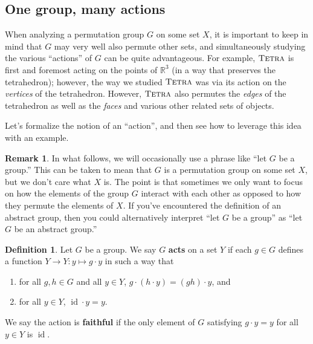 \documentclass[11pt]{amsart}
\theoremstyle{plain}
\theoremstyle{definition}
\newtheorem*{definition*}{Definition}
\newtheorem*{remark*}{Remark}
\theoremstyle{remark}
\newcommand{\symtetra}{\textsc{Tetra}}
\DeclareMathOperator{\id}{id}
\begin{document}
\subsection{One group, many actions}

When analyzing a permutation group $G$ on some set $X$, it is  important to keep in mind that $G$ may very well also permute other sets, and simultaneously studying the various ``actions'' of $G$ can be quite advantageous. For example, $\symtetra$ is first and foremost acting on the points of $\mathbb{R}^3$ (in a way that preserves the tetrahedron); however, the way we studied $\symtetra$ was via its action on the \emph{vertices} of the tetrahedron. However, $\symtetra$ also permutes the \emph{edges} of the tetrahedron as well as the \emph{faces} and various other related sets of objects. 

Let's formalize the notion of an ``action'', and then see how to leverage this idea with an example.

\begin{remark*}
In what follows, we will occasionally use a phrase like ``let $G$ be a group.'' This can be taken to mean that $G$ is a permutation group on some set $X$, but we don't care what $X$ is. The point is that sometimes we only want to focus on how the elements of the group $G$ interact with each other as opposed to how they permute the elements of $X$. If you've encountered the definition of an abstract group, then you could alternatively interpret ``let $G$ be a group'' as ``let $G$ be an abstract group.''
\end{remark*}

\begin{definition*}
Let $G$ be a group. We say $G$ \textbf{acts} on a set $Y$ if each $g\in G$ defines a function $Y \rightarrow Y : y \mapsto g\cdot y$ in such a way that 
\begin{enumerate}
\item for all $g,h\in G$ and all $y\in Y$, $g\cdot (h\cdot y) = (gh)\cdot y$, and
\item for all $y\in Y$, $\id\cdot y = y$.
\end{enumerate}
We say the action is \textbf{faithful} if the only element of $G$ satisfying $g\cdot y = y$ for all $y\in Y$ is $\id$.
\end{definition*}
\end{document}
